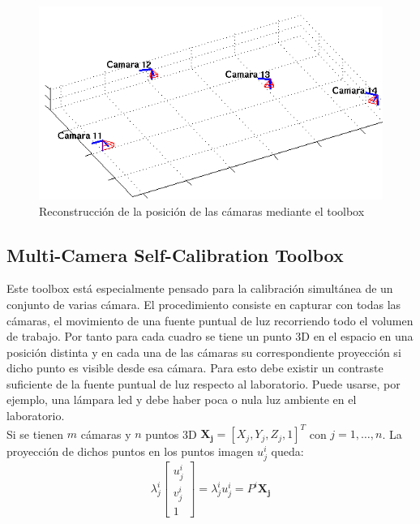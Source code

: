 \begin{figure}[ht!]
\begin{center}
\includegraphics[scale=0.7]{img/calibracion/tablero_cam_relevadas_4c.png}
\end{center}
\caption{Reconstrucción de la posición de las cámaras mediante el toolbox}
\label{fig: tablero_posicion_camaras}
\end{figure}


 \subsection{ Multi-Camera Self-Calibration Toolbox \cite{toolbox_led}} 
 
 Este toolbox está especialmente pensado para la calibración simultánea de un conjunto de varias cámara. El procedimiento consiste en capturar con todas las cámaras, el movimiento de una fuente puntual de luz recorriendo todo el volumen de trabajo. Por tanto para cada cuadro se tiene un punto 3D en el espacio en una posición distinta y en cada una de las cámaras su correspondiente proyección si dicho punto es visible desde esa cámara. Para esto debe existir un contraste suficiente de la fuente puntual de luz respecto al laboratorio. Puede usarse, por ejemplo, una lámpara led y debe haber poca o nula luz ambiente en el laboratorio.\\
 
 
 Si se tienen $m$ cámaras y $n$ puntos 3D  
$\mathbf{X_j} = [X_j, Y_j, Z_j,1]^T$ con $j=1,\ldots,n$. La proyección de dichos puntos en los puntos imagen $u_j^i$ queda:
\[ \lambda_j^i
\begin{bmatrix}
u_j^i \\
v_j^i \\
1
\end{bmatrix} 
 = \lambda_j^i u_j^i = P^i \mathbf{X_j}
\]

